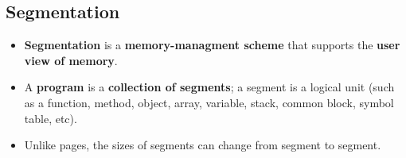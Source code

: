 \documentclass{article}
\begin{document}
    \subsection*{Segmentation}
    \begin{itemize}
        \item \textbf{Segmentation} is a \textbf{memory-managment scheme} that supports the \textbf{user view of memory}.
        \item A \textbf{program} is a \textbf{collection of segments}; a segment is a logical unit (such as a function, method, object, array, variable, stack, common block, symbol table, etc).
        \item Unlike pages, the sizes of segments can change from segment to segment.
    \end{itemize}
\end{document}

